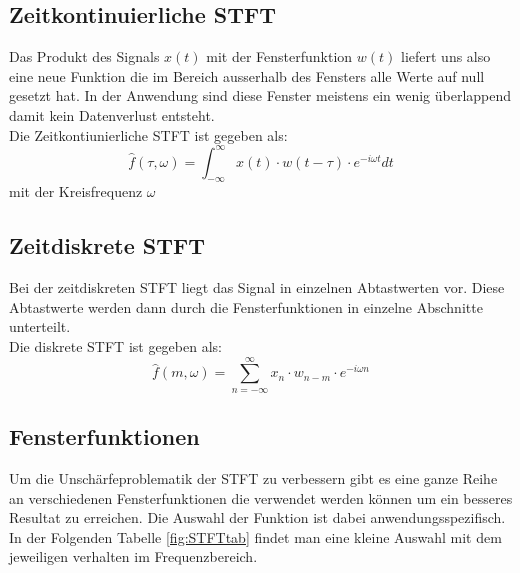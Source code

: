 \subsection{Zeitkontinuierliche STFT}

Das Produkt des Signals $x(t)$ mit der Fensterfunktion $w(t) $ liefert uns also eine neue Funktion die im Bereich ausserhalb des Fensters alle Werte auf null gesetzt hat. In der Anwendung sind diese Fenster meistens ein wenig überlappend damit kein Datenverlust entsteht. \\
Die Zeitkontiunierliche STFT ist  gegeben als:
\begin{equation}
	\hat{f}(\tau, \omega)=\int_{-\infty}^{\infty} x(t)\cdot w(t-\tau)\cdot e^{-i \omega t} dt
\end{equation}
mit der Kreisfrequenz  $\omega $

\subsection{Zeitdiskrete STFT}
Bei der zeitdiskreten STFT liegt das Signal in einzelnen Abtastwerten vor. Diese Abtastwerte werden dann durch die Fensterfunktionen in einzelne Abschnitte unterteilt. \\
Die diskrete STFT ist gegeben als:
\begin{equation}
	\hat{f}(m, \omega)=\sum_{n=-\infty}^{\infty} x_{n} \cdot w_{n-m}\cdot e^{-i \omega n}
\end{equation}


\subsection{Fensterfunktionen}
Um die Unschärfeproblematik der STFT zu verbessern gibt es eine ganze Reihe an verschiedenen Fensterfunktionen die verwendet werden können um ein besseres Resultat zu erreichen. Die Auswahl der Funktion ist dabei anwendungsspezifisch. In der Folgenden Tabelle \ref{fig:STFTtab} findet man eine kleine Auswahl mit dem jeweiligen verhalten im Frequenzbereich. 


